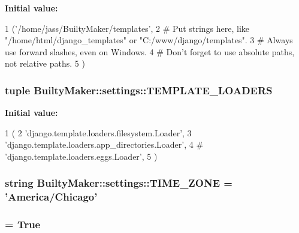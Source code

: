 {\bfseries \-Initial value\-:}
\begin{DoxyCode}
1 ('/home/jass/BuiltyMaker/templates',
2     # Put strings here, like "/home/html/django_templates" or
       "C:/www/django/templates".
3     # Always use forward slashes, even on Windows.
4     # Don't forget to use absolute paths, not relative paths.
5 )
\end{DoxyCode}
\hypertarget{namespaceBuiltyMaker_1_1settings_a18dc06dd6238439837ab2c6d7972c059}{
\subsubsection[{\-T\-E\-M\-P\-L\-A\-T\-E\-\_\-\-L\-O\-A\-D\-E\-R\-S}]{\setlength{\rightskip}{0pt plus 5cm}tuple {\bf \-Builty\-Maker\-::settings\-::\-T\-E\-M\-P\-L\-A\-T\-E\-\_\-\-L\-O\-A\-D\-E\-R\-S}}}\label{namespaceBuiltyMaker_1_1settings_a18dc06dd6238439837ab2c6d7972c059}
{\bfseries \-Initial value\-:}
\begin{DoxyCode}
1 (
2     'django.template.loaders.filesystem.Loader',
3     'django.template.loaders.app_directories.Loader',
4 #     'django.template.loaders.eggs.Loader',
5 )
\end{DoxyCode}
\hypertarget{namespaceBuiltyMaker_1_1settings_a3cba4c42996704d32bdc29af662176db}{
\subsubsection[{\-T\-I\-M\-E\-\_\-\-Z\-O\-N\-E}]{\setlength{\rightskip}{0pt plus 5cm}string {\bf \-Builty\-Maker\-::settings\-::\-T\-I\-M\-E\-\_\-\-Z\-O\-N\-E} = '\-America/\-Chicago'}}\label{namespaceBuiltyMaker_1_1settings_a3cba4c42996704d32bdc29af662176db}
\hypertarget{namespaceBuiltyMaker_1_1settings_a4429522ef11a37bbed0139cca908f495}{
\subsubsection[{\-U\-S\-E\-\_\-\-I18\-N}]{ = \-True}}\label{namespaceBuiltyMaker_1_1settings_a4429522ef11a37bbed0139cca908f495}
